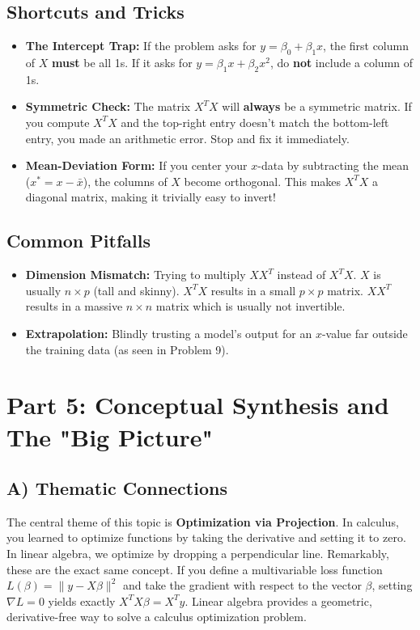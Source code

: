 \documentclass[11pt, letterpaper]{article}
\theoremstyle{definition}
\theoremstyle{remark}
\begin{document}
\subsection*{Shortcuts and Tricks}
\begin{itemize}
    \item \textbf{The Intercept Trap:} If the problem asks for $y = \beta_0 + \beta_1 x$, the first column of $X$ \textbf{must} be all 1s. If it asks for $y = \beta_1 x + \beta_2 x^2$, do \textbf{not} include a column of 1s.
    \item \textbf{Symmetric Check:} The matrix $X^T X$ will \textbf{always} be a symmetric matrix. If you compute $X^T X$ and the top-right entry doesn't match the bottom-left entry, you made an arithmetic error. Stop and fix it immediately.
    \item \textbf{Mean-Deviation Form:} If you center your $x$-data by subtracting the mean ($x^* = x - \bar{x}$), the columns of $X$ become orthogonal. This makes $X^T X$ a diagonal matrix, making it trivially easy to invert!
\end{itemize}

\subsection*{Common Pitfalls}
\begin{itemize}
    \item \textbf{Dimension Mismatch:} Trying to multiply $X X^T$ instead of $X^T X$. $X$ is usually $n \times p$ (tall and skinny). $X^T X$ results in a small $p \times p$ matrix. $X X^T$ results in a massive $n \times n$ matrix which is usually not invertible.
    \item \textbf{Extrapolation:} Blindly trusting a model's output for an $x$-value far outside the training data (as seen in Problem 9).
\end{itemize}

\newpage
\section{Part 5: Conceptual Synthesis and The "Big Picture"}

\subsection{A) Thematic Connections}
The central theme of this topic is \textbf{Optimization via Projection}. In calculus, you learned to optimize functions by taking the derivative and setting it to zero. In linear algebra, we optimize by dropping a perpendicular line. 
Remarkably, these are the exact same concept. If you define a multivariable loss function $L(\beta) = \|y - X\beta\|^2$ and take the gradient with respect to the vector $\beta$, setting $\nabla L = 0$ yields exactly $X^T X \beta = X^T y$. Linear algebra provides a geometric, derivative-free way to solve a calculus optimization problem.
\end{document}

